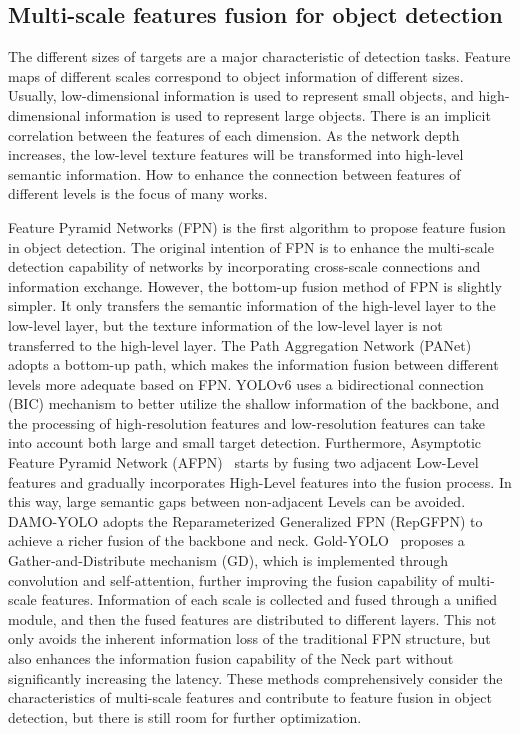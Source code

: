 \subsection{Multi-scale features fusion for object detection}
The different sizes of targets are a major characteristic of detection tasks. Feature maps of different scales correspond to object information of different sizes. Usually, low-dimensional information is used to represent small objects, and high-dimensional information is used to represent large objects. There is an implicit correlation between the features of each dimension. As the network depth increases, the low-level texture features will be transformed into high-level semantic information. How to enhance the connection between features of different levels is the focus of many works. 

Feature Pyramid Networks (FPN) is the first algorithm to propose feature fusion in object detection. The original intention of FPN is to enhance the multi-scale detection capability of networks by incorporating cross-scale connections and information exchange. However, the bottom-up fusion method of FPN is slightly simpler. It only transfers the semantic information of the high-level layer to the low-level layer, but the texture information of the low-level layer is not transferred to the high-level layer. The Path Aggregation Network (PANet) adopts a bottom-up path, which makes the information fusion between different levels more adequate based on FPN. YOLOv6 uses a bidirectional connection (BIC) mechanism to better utilize the shallow information of the backbone, and the processing of high-resolution features and low-resolution features can take into account both large and small target detection. Furthermore, Asymptotic Feature Pyramid Network (AFPN)~\cite{afpn} starts by fusing two adjacent Low-Level features and gradually incorporates High-Level features into the fusion process. In this way, large semantic gaps between non-adjacent Levels can be avoided. DAMO-YOLO adopts the Reparameterized Generalized FPN (RepGFPN) to achieve a richer fusion of the backbone and neck. Gold-YOLO~\cite{goldyolo} proposes a Gather-and-Distribute mechanism (GD), which is implemented through convolution and self-attention, further improving the fusion capability of multi-scale features. Information of each scale is collected and fused through a unified module, and then the fused features are distributed to different layers. This not only avoids the inherent information loss of the traditional FPN structure, but also enhances the information fusion capability of the Neck part without significantly increasing the latency. These methods comprehensively consider the characteristics of multi-scale features and contribute to feature fusion in object detection, but there is still room for further optimization.

